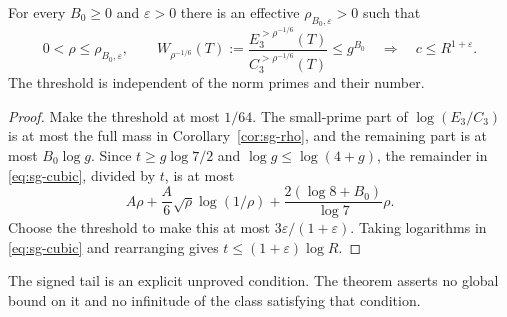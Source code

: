 \begin{theorem}\label{thm:sg-tail}
For every $B_0\ge0$ and $\varepsilon>0$ there is an effective
$\rho_{B_0,\varepsilon}>0$ such that
\[
 0<\rho\le\rho_{B_0,\varepsilon},\qquad
 W_{\rho^{-1/6}}(T):=\frac{E_3^{>\rho^{-1/6}}(T)}
 {C_3^{>\rho^{-1/6}}(T)}\le g^{B_0}
 \quad\Longrightarrow\quad c\le R^{1+\varepsilon}.
\]
The threshold is independent of the norm primes and their number.
\end{theorem}
\begin{proof}
Make the threshold at most $1/64$. The small-prime part of
$\log(E_3/C_3)$ is at most the full mass in Corollary~\ref{cor:sg-rho}, and
the remaining part is at most $B_0\log g$. Since $t\ge g\log7/2$ and
$\log g\le\log(4+g)$, the remainder in \eqref{eq:sg-cubic}, divided by
$t$, is at most
\[
 A\rho+\frac A6\sqrt\rho\log(1/\rho)
 +\frac{2(\log8+B_0)}{\log7}\rho.
\]
Choose the threshold to make this at most
$3\varepsilon/(1+\varepsilon)$. Taking logarithms in
\eqref{eq:sg-cubic} and rearranging gives
$t\le(1+\varepsilon)\log R$.
\end{proof}
The signed tail is an explicit unproved condition. The theorem asserts no
global bound on it and no infinitude of the class satisfying that condition.


